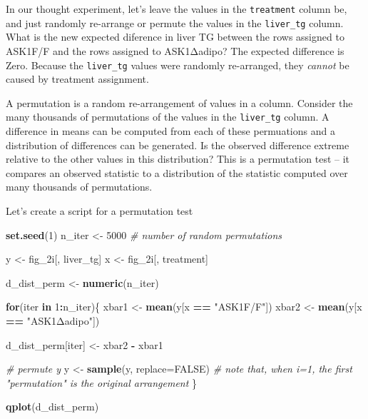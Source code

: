 \documentclass[]{book}
\newenvironment{Shaded}{\begin{snugshade}}{\end{snugshade}}
\newcommand{\CommentTok}[1]{\textcolor[rgb]{0.56,0.35,0.01}{\textit{#1}}}
\newcommand{\ControlFlowTok}[1]{\textcolor[rgb]{0.13,0.29,0.53}{\textbf{#1}}}
\newcommand{\DataTypeTok}[1]{\textcolor[rgb]{0.13,0.29,0.53}{#1}}
\newcommand{\DecValTok}[1]{\textcolor[rgb]{0.00,0.00,0.81}{#1}}
\newcommand{\KeywordTok}[1]{\textcolor[rgb]{0.13,0.29,0.53}{\textbf{#1}}}
\newcommand{\NormalTok}[1]{#1}
\newcommand{\OperatorTok}[1]{\textcolor[rgb]{0.81,0.36,0.00}{\textbf{#1}}}
\newcommand{\OtherTok}[1]{\textcolor[rgb]{0.56,0.35,0.01}{#1}}
\newcommand{\StringTok}[1]{\textcolor[rgb]{0.31,0.60,0.02}{#1}}
\begin{document}
In our thought experiment, let's leave the values in the \texttt{treatment} column be, and just randomly re-arrange or permute the values in the \texttt{liver\_tg} column. What is the new expected diference in liver TG between the rows assigned to ASK1F/F and the rows assigned to ASK1Δadipo? The expected difference is Zero. Because the \texttt{liver\_tg} values were randomly re-arranged, they \emph{cannot} be caused by treatment assignment.

A permutation is a random re-arrangement of values in a column. Consider the many thousands of permutations of the values in the \texttt{liver\_tg} column. A difference in means can be computed from each of these permuations and a distribution of differences can be generated. Is the observed difference extreme relative to the other values in this distribution? This is a permutation test -- it compares an observed statistic to a distribution of the statistic computed over many thousands of permutations.

Let's create a script for a permutation test

\begin{Shaded}
\begin{Highlighting}[]
\KeywordTok{set.seed}\NormalTok{(}\DecValTok{1}\NormalTok{)}
\NormalTok{n_iter <-}\StringTok{ }\DecValTok{5000} \CommentTok{# number of random permutations}

\NormalTok{y <-}\StringTok{ }\NormalTok{fig_2i[, liver_tg]}
\NormalTok{x <-}\StringTok{ }\NormalTok{fig_2i[, treatment]}

\NormalTok{d_dist_perm <-}\StringTok{ }\KeywordTok{numeric}\NormalTok{(n_iter)}

\ControlFlowTok{for}\NormalTok{(iter }\ControlFlowTok{in} \DecValTok{1}\OperatorTok{:}\NormalTok{n_iter)\{}
\NormalTok{  xbar1 <-}\StringTok{ }\KeywordTok{mean}\NormalTok{(y[x }\OperatorTok{==}\StringTok{ "ASK1F/F"}\NormalTok{])}
\NormalTok{  xbar2 <-}\StringTok{ }\KeywordTok{mean}\NormalTok{(y[x }\OperatorTok{==}\StringTok{ "ASK1Δadipo"}\NormalTok{])}
  
\NormalTok{  d_dist_perm[iter] <-}\StringTok{ }\NormalTok{xbar2 }\OperatorTok{-}\StringTok{ }\NormalTok{xbar1}
  
  \CommentTok{# permute y}
\NormalTok{  y <-}\StringTok{ }\KeywordTok{sample}\NormalTok{(y, }\DataTypeTok{replace=}\OtherTok{FALSE}\NormalTok{)}
  \CommentTok{# note that, when i=1, the first "permutation" is the original arrangement}
\NormalTok{\}}

\KeywordTok{qplot}\NormalTok{(d_dist_perm)}
\end{Highlighting}
\end{Shaded}
\end{document}
